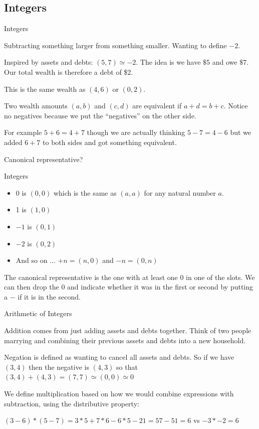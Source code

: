 \documentclass{beamer}
\begin{document}
\subsection{Integers}

\begin{frame}{Integers}

Subtracting something larger from something smaller. Wanting to define $-2$.

Inspired by assets and debts:  $(5, 7) \simeq -2$. The idea is we have $\$5$ and owe $\$7$. Our total wealth is therefore a debt of \$2. 

This is the same wealth as $(4,6)$ or $(0,2)$.

Two wealth amounts $(a,b)$ and $(c,d)$ are equivalent if $a+d = b+c$. Notice no negatives because we put the ``negatives'' on the other side.

For example $5+6 = 4+7$ though we are actually thinking $5-7 = 4-6$ but we added $6+7$ to both sides and got something equivalent. 

Canonical representative? 

\end{frame}

\begin{frame}{Integers}

\begin{itemize}
    \item 0 is  $(0,0)$ which is the same as $(a,a)$ for any natural number $a$.
    \item 1 is  $(1,0)$
    \item $-1$ is $(0,1)$
    \item $-2$ is $(0,2)$
    \item And so on ... $+n = (n, 0)$ and $-n = (0,n)$
\end{itemize}

The canonical representative is the one with at least one 0 in one of the slots. We can then drop the 0 and indicate whether it was in the first or second by putting a $-$ if it is in the second. 


\end{frame}

\begin{frame}{Arithmetic of Integers}

Addition comes from just adding assets and debts together. Think of two people marrying and combining their previous assets and debts into a new household. 

Negation is defined as wanting to cancel all assets and debts. So if we have $(3,4)$ then the negative is $(4,3)$ so that $(3,4) + (4,3) = (7,7) \simeq (0,0) \simeq 0$

We define multiplication based on how we would combine expressions with subtraction, using the distributive property: 

$(3-6)*(5-7) = 3*5 + 7*6 - 6*5 - 21 = 57 - 51=6$ vs $-3*-2 = 6$ 


\end{frame}
\end{document}
